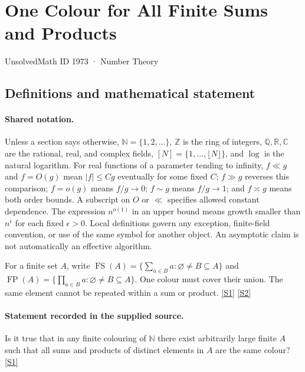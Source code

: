 \documentclass[11pt,a4paper]{article}
\newcommand{\N}{\mathbb{N}}
\newcommand{\Z}{\mathbb{Z}}
\newcommand{\Q}{\mathbb{Q}}
\newcommand{\R}{\mathbb{R}}
\newcommand{\C}{\mathbb{C}}
\newcommand{\sref}[2]{\hyperlink{source:#1:#2}{[S#2]}}
\begin{document}

\setcounter{section}{1972}

\section{One Colour for All Finite Sums and Products}\label{1973}

{\small\sffamily UnsolvedMath ID 1973 · Number Theory}

\subsection{Definitions and mathematical statement}

\paragraph{Shared notation.}Unless a section says otherwise, $\N=\{1,2,\ldots\}$,
$\Z$ is the ring of integers, $\Q,\R,\C$ are the rational, real, and complex
fields, $[N]=\{1,\ldots,\lfloor N\rfloor\}$, and $\log$ is the natural
logarithm. For real functions of a parameter tending to infinity,
$f\ll g$ and $f=O(g)$ mean $|f|\leq Cg$ eventually for some fixed $C$;
$f\gg g$ reverses this comparison; $f=o(g)$ means $f/g\to0$;
$f\sim g$ means $f/g\to1$; and $f\asymp g$ means both order bounds.
A subscript on $O$ or $\ll$ specifies allowed constant dependence.
The expression $n^{o(1)}$ in an upper bound means growth smaller than
$n^\epsilon$ for each fixed $\epsilon>0$. Local definitions govern any
exception, finite-field convention, or use of the same symbol for another
object. An asymptotic claim is not automatically an effective algorithm.



For a finite set $A$, write $\operatorname{FS}(A)=\{\sum_{a\in B}a:\varnothing\ne B\subseteq A\}$ and $\operatorname{FP}(A)=\{\prod_{a\in B}a:\varnothing\ne B\subseteq A\}$. One colour must cover their union. The same element cannot be repeated within a sum or product. \sref{1973}{1} \sref{1973}{2}

\paragraph{Statement recorded in the supplied source.}
Is it true that in any finite colouring of $\mathbb{N}$ there exist arbitrarily large finite $A$ such that all sums and products of distinct elements in $A$ are the same colour? \sref{1973}{1}
\end{document}
